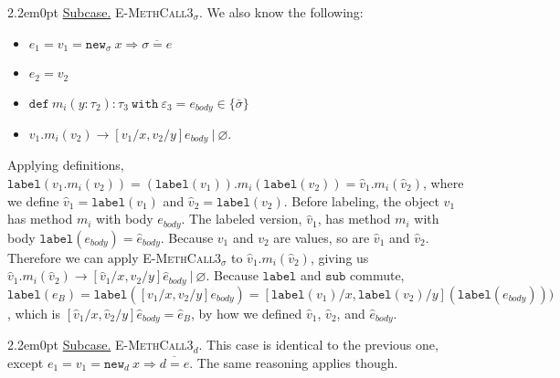\documentclass{llncs}
\newcommand{\keywadj}[1]{\mathtt{#1}}
\newcommand{\keyw}[1]{\keywadj{#1}~}
\newcommand{\kwa}[1]{\keywadj{ #1 }}
\newcommand{\subcase}[1] {
	\begin{adjustwidth}{2.2em}{0pt}
		\underline{Subcase.} #1
	\end{adjustwidth}
}
\newcommand{\type}[2]{
	#1~\keyw{with} #2
}
\newcommand{\newd}[0]{
	\keywadj{new}_d~x \Rightarrow \overline{d = e}
}
\newcommand{\newsig}[0]{
	\keywadj{new}_\sigma~x \Rightarrow \overline{\sigma = e}
}
\begin{document}
{{\subcase{ \textsc{E-MethCall3$_\sigma$}. We also know the following:
\begin{itemize}
	\item $e_1 = v_1 = \newsig$
	\item $e_2 = v_2$
	\item $\keywadj{def~} m_i(y : \tau_2) : \type{\tau_3}{\varepsilon_3} = e_{body} \in \{ \bar \sigma \}$
	\item $v_1.m_i(v_2) \longrightarrow [v_1/x, v_2/y]e_{body}~|~\varnothing$.
\end{itemize}
\noindent
Applying definitions, $\keywadj{label}(v_1.m_i(v_2)) = (\keywadj{label}(v_1)).m_i(\keywadj{label}(v_2)) = \hat v_1.m_i(\hat v_2)$, where we define $\hat v_1 = \kwa{label}(v_1)$ and $\hat v_2 = \kwa{label}(v_2)$. Before labeling, the object $v_1$ has method $m_i$ with body $e_{body}$. The labeled version, $\hat v_1$, has method $m_i$ with body $\keywadj{label}(e_{body}) = \hat e_{body}$. Because $v_1$ and $v_2$ are values, so are $\hat v_1$ and $\hat v_2$. Therefore we can apply \textsc{E-MethCall3$_\sigma$} to $\hat v_1.m_i(\hat v_2)$, giving us $\hat v_1.m_i(\hat v_2) \longrightarrow [\hat v_1 / x, \hat v_2 / y]\hat e_{body}~|~\varnothing$. Because $\keywadj{label}$ and $\keywadj{sub}$ commute, $\keywadj{label}(e_B) = \keywadj{label}([v_1/x, v_2/y]e_{body}) = [\keywadj{label}(v_1)/x, \keywadj{label}(v_2)/y](\keywadj{label}(e_{body})))$, which is $[\hat v_1/x, \hat v_2/y] \hat e_{body} = \hat e_B$, by how we defined $\hat v_1$, $\hat v_2$, and $\hat e_{body}$.\\
}


\subcase{ \textsc{E-MethCall3$_d$}.
This case is identical to the previous one, except $e_1 = v_1 = \newd$. The same reasoning applies though.
}

}
}





\end{document}
